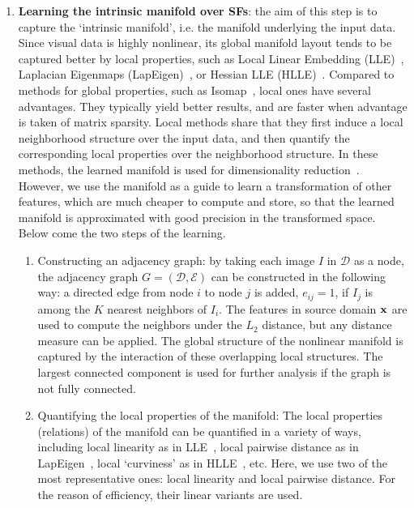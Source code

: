 \documentclass[10pt,twocolumn,letterpaper]{article}
\begin{document}
\begin{enumerate} [leftmargin=4.5mm]
\item \textbf{Learning the intrinsic manifold over SFs}: the aim of
  this step is to capture the `intrinsic manifold', i.e. the manifold
  underlying the input data. Since visual data is highly nonlinear, 
  its global manifold layout tends to be captured better by local 
  properties, such as Local Linear Embedding (LLE)~\cite{lle:science00}, 
  Laplacian Eigenmaps (LapEigen)~\cite{eigenmaps:nips01}, or Hessian 
  LLE (HLLE)~\cite{hlle}. Compared to methods for global properties, such
  as Isomap~\cite{isomap:00}, local ones have several advantages. They
  typically yield better results, and are faster when advantage is taken 
  of matrix sparsity. Local methods share that they first induce a
  local neighborhood structure over the input data, and then quantify
  the corresponding local properties over the neighborhood
  structure. In these methods, the learned manifold is used for
  dimensionality reduction~\cite{lle:science00, eigenmaps:nips01,
    hlle}. However, we use the manifold as a guide to learn a
  transformation of other features, which are much cheaper to compute
  and store, so that the learned manifold is approximated with good
  precision in the transformed space. Below come the two steps of
  the learning.
 
 \begin{enumerate} [leftmargin=5mm]
 \item Constructing an adjacency graph: by taking each image $I$ in
   $\mathcal{D}$ as a node, the adjacency graph $G = (\mathcal{D},
   \mathcal{E})$ can be constructed in the following way: a directed
   edge from node $i$ to node $j$ is added, \ie $e_{ij}=1$, if $I_j$
   is among the $K$ nearest neighbors of $I_i$. The features in source
   domain ${{\mathbf x}}$ are used to compute the neighbors under the $L_2$
   distance, but any distance measure can be applied. The global
   structure of the nonlinear manifold is captured by the interaction
   of these overlapping local structures. The largest connected
   component is used for further analysis if the graph is not fully
   connected.
   
 \item Quantifying the local properties of the manifold: The local
   properties (relations) of the manifold can be quantified in a variety
   of ways, including local linearity as in
   LLE~\cite{lle:science00, NPEmbedding:iccv05}, local pairwise
   distance as in LapEigen~\cite{eigenmaps:nips01}, local `curviness' as in
   HLLE~\cite{hlle}, etc. Here, we use two of
   the most representative ones: local linearity and local pairwise
   distance. For the reason of efficiency, their linear variants are
   used.
   

\end{enumerate}
\end{enumerate}
\end{document}
